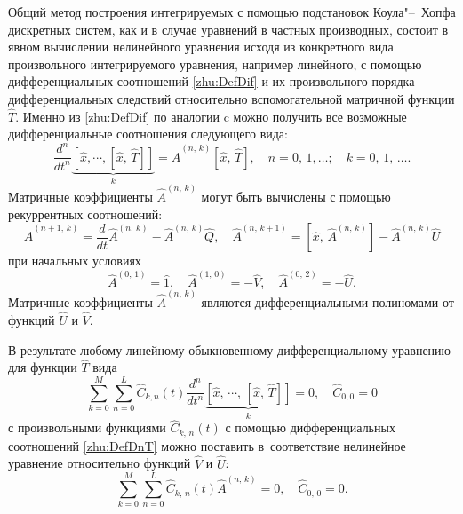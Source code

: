         Общий метод построения интегрируемых с помощью подстановок Коула"--~Хопфа дискретных
        систем, как и в случае уравнений в частных производных, состоит в
        явном вычислении нелинейного уравнения исходя из конкретного вида
        произвольного интегрируемого уравнения, например
        линейного, с помощью дифференциальных соотношений
        \eqref{zhu:DefDif} и их произвольного порядка дифференциальных
        следствий относительно вспомогательной матричной функции $\hat{T}$.
        Именно из \eqref{zhu:DefDif} по аналогии c \cite{zhu:ZhTMF09} можно
        получить все возможные дифференциальные соотношения
        следующего вида:
        \begin{equation}
        \label{zhu:DefDnT}
            \frac{d^n}{dt^n}\underbrace{[\hat{x},\cdots,[\hat{x},\,\hat{T}]]}\limits_{k}=\hat{A}^{(n,\,k)}[\hat{x},\,\hat{T}],\quad
            n=0,\,1,\ldots; \quad k=0,\,1,\,\ldots.
        \end{equation}
        Матричные коэффициенты $\hat{A}^{(n,\,k)}$ могут быть вычислены с помощью
        рекуррентных соотношений:
        \begin{equation}
        \label{zhu:DefA}
        \hat{A}^{(n+1,\,k)} = \frac{d}{dt}\hat{A}^{(n,\,k)} -
            \hat{A}^{(n,\,k)}\hat{Q}, \quad
            \hat{A}^{(n,\,k+1)} = [\hat{x},\,\hat{A}^{(n,\,k)}] -
            \hat{A}^{(n,\,k)}\hat{U}
        \end{equation}
        при начальных условиях
        $$
        \hat{A}^{(0,\,1)} = \hat{1}, \quad \hat{A}^{(1,\,0)}= - \hat{V}, \quad \hat{A}^{(0,\,2)}=-\hat{U}.
        $$
        Матричные коэффициенты $\hat{A}^{(n,\,k)}$ являются
        дифференциальными полиномами от функций $\hat{U}$ и $\hat{V}$.

        В результате любому линейному обыкновенному
        дифференциальному уравнению для функции $\hat{T}$ вида
        \begin{equation}
        \label{zhu:DefEqT}
            \sum\limits_{k=0}^M \sum\limits_{n=0}^L
            \hat{C}_{k,n}(t)\frac{d^n}{dt^n}\underbrace{[\hat{x},\,\cdots,\,[\hat{x},\,\hat{T}]]}\limits_{k}=0, \quad \hat{C}_{0,0}=0
        \end{equation}
        с произвольными функциями $\hat{C}_{k,\,n}(t)$ с помощью
        дифференциальных соотношений \eqref{zhu:DefDnT} можно поставить в~соответствие
        нелинейное уравнение относительно функций $\hat{V}$ и $\hat{U}$:
        \begin{equation}
        \label{zhu:EqDUV}
            \sum\limits_{k=0}^M \sum\limits_{n=0}^L
            \hat{C}_{k,\,n}(t)\hat{A}^{(n,\,k)}=0, \quad \hat{C}_{0,\,0}=0.
        \end{equation}

